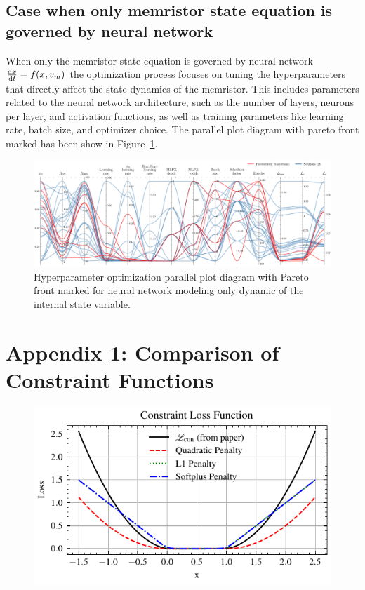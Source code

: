 \documentclass[11pt, oneside]{article}
\newcommand{\dert}[1]{\frac{{\rm d} {#1}}{{\rm d} t} }
\begin{document}
\subsection{Case when only memristor state equation is governed by neural network}

When only the memristor state equation is governed by neural network
$\dert{x} = f(x,v_m)$ the optimization process focuses on tuning the hyperparameters that directly affect the state dynamics of the memristor. This includes parameters related to the neural network architecture, such as the number of layers, neurons per layer, and activation functions, as well as training parameters like learning rate, batch size, and optimizer choice. The parallel plot diagram with pareto front marked has been show in Figure~\ref{fig:nn_state_hyperparameter_optimization}.
\begin{figure}[H]
    \centering
    \includegraphics[width=\textwidth]{mms_figs/parallel_coordinates_plot_mlpx.pdf}
    \caption{Hyperparameter optimization parallel plot diagram with Pareto front marked for neural network modeling only dynamic of the internal state variable.}
    \label{fig:nn_state_hyperparameter_optimization}
\end{figure}




\clearpage
\section*{Appendix 1: Comparison of Constraint Functions}
\begin{figure}[H]
    \centering
    \includegraphics[width=0.8\linewidth]{figs/constraint_loss_functions.pdf}
    \caption*{}
\end{figure}
\end{document}

